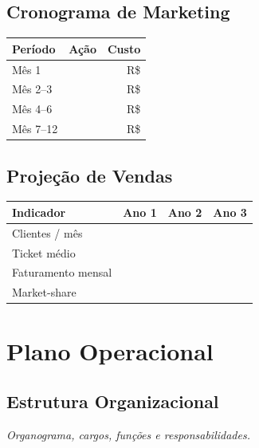 \documentclass[
	12pt,
	openright,
	oneside,
	a4paper,
	chapter=TITLE,
	section=TITLE,
	english,
	brazil
	]{abntex2}
\newcommand{\tcampo}[1]{%
	{#1}%
}
\newcommand{\instrucao}[1]{%
	\vspace{0.3cm}%
	\noindent%
	{%
		\setlength{\fboxsep}{6pt}%
		\colorbox{azul-claro}{%
			\begin{minipage}{\dimexpr\textwidth-2\fboxsep\relax}%
				\setlength{\parindent}{1.25cm}%
				{\color{cinza-instrucao}\small\itshape #1}%
			\end{minipage}%
		}%
	}%
	\vspace{0.3cm}%
}
\begin{document}
\section{Cronograma de Marketing}

\centering
\begin{tabularx}{\textwidth}{X X r}
\toprule
\rowcolor{azul-claro}
\textbf{Período} & \textbf{Ação} & \textbf{Custo} \\
\midrule
Mês 1       & \tcampo{} & R\$ \tcampo{} \\
Mês 2--3    & \tcampo{} & R\$ \tcampo{} \\
Mês 4--6    & \tcampo{} & R\$ \tcampo{} \\
Mês 7--12   & \tcampo{} & R\$ \tcampo{} \\
\bottomrule
\end{tabularx}

\section{Projeção de Vendas}

\centering
\begin{tabularx}{\textwidth}{X r r r}
\toprule
\rowcolor{azul-claro}
\textbf{Indicador} & \textbf{Ano 1} & \textbf{Ano 2} & \textbf{Ano 3} \\
\midrule
Clientes / mês     & \tcampo{} & \tcampo{} & \tcampo{} \\
Ticket médio       & \tcampo{} & \tcampo{} & \tcampo{} \\
Faturamento mensal & \tcampo{} & \tcampo{} & \tcampo{} \\
Market-share       & \tcampo{} & \tcampo{} & \tcampo{} \\
\bottomrule
\end{tabularx}
\label{tab:projecao-vendas}

\clearpage

\chapter{Plano Operacional}

\section{Estrutura Organizacional}

\instrucao{Organograma, cargos, funções e responsabilidades.}
\end{document}
